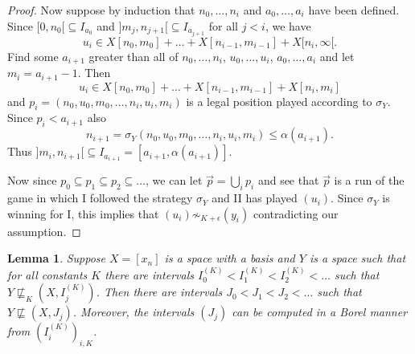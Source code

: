 \documentclass[10pt]{amsart}
\numberwithin{equation}{section}
\newtheorem{lemme}[thm]{Lemma}
\begin{document}
\begin{proof}
Now suppose by induction that $n_0,\ldots, n_i$ and $a_0,\ldots, a_i$ have been
defined. Since $[0,n_0[\subseteq I_{a_0}$ and $]m_j,n_{j+1}[\subseteq
I_{a_{j+1}}$ for all $j<i$, we have
$$
u_{i}\in X[n_0,m_0]+\ldots + X[n_{i-1},m_{i-1}]+ X[n_i,\infty[.
$$
Find some $a_{i+1}$  greater than all of $n_0,\ldots, n_i$, $u_0,\ldots, u_i$,
$a_0,\ldots, a_i$ and let $m_i=a_{i+1}-1$. Then
$$
u_{i}\in X[n_0,m_0]+\ldots + X[n_{i-1},m_{i-1}]+ X[n_i,m_i]
$$
and $p_i=(n_0,u_0,m_0,\ldots, n_i,u_i,m_i)$ is a legal position played
according to $\sigma_Y$. Since $p_i<a_{i+1}$ also
$$
n_{i+1}=\sigma_Y(n_0,u_0,m_0,\ldots, n_i,u_i,m_i){\ensuremath{\leqslant}} \alpha(a_{i+1}).
$$
Thus $]m_i,n_{i+1}[\subseteq I_{a_{i+1}}=[a_{i+1},\alpha(a_{i+1})]$.

Now since $p_0\subseteq p_1\subseteq p_2\subseteq\ldots$, we can let $\vec
p=\bigcup_ip_i$ and see that $\vec p$ is a run of the game in which I followed
the strategy $\sigma_Y$ and II has played $(u_i)$. Since $\sigma_Y$ is winning
for I, this implies that $(u_i)\not\sim_{K+\epsilon}(y_i)$ contradicting our
assumption.
\end{proof}

\begin{lemme}\label{interval diagonalisation}
Suppose $X=[x_n]$ is a space with a basis and $Y$ is a space such that for all
constants $K$ there are intervals $I_0^{(K)}<I_1^{(K)}<I^{(K)}_2<\ldots$ such
that $Y\not\sqsubseteq_K(X,I^{(K)}_j)$. Then there are intervals
$J_0<J_1<J_2<\ldots$ such that $Y\not\sqsubseteq (X,J_j)$. Moreover, the
intervals $(J_j)$ can be computed in a  Borel manner from $(I_i^{(K)})_{i,K}$.
\end{lemme}
\end{document}
